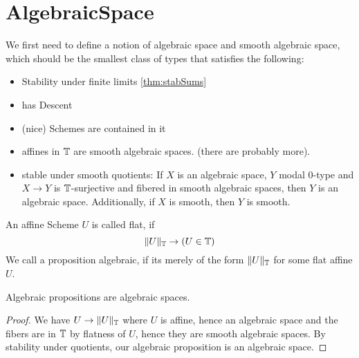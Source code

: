 \section{AlgebraicSpace}
We first need to define a notion of algebraic space and smooth algebraic space, which should be the smallest class of types that satisfies the following:
\begin{itemize}
	\item Stability under finite limits \ref{thm:stabSums} 
	\item has Descent
	\item (nice) Schemes are contained in it
	\item affines in $\mathbb{T}$ are smooth algebraic spaces.  (there are probably more). %
	\item stable under smooth quotients: If $X$ is an algebraic space, $Y$ modal 0-type and $X \to Y$ is $\mathbb{T}$-surjective and fibered in smooth algebraic spaces, then $Y$ is an algebraic space. Additionally, if $X$ is smooth, then $Y$ is smooth.
\end{itemize}
\begin{definition}
	An affine Scheme $U$ is called flat, if 
	\[\|U\|_{\mathbb{T}} \to (U \in \mathbb{T})\]	
	We call a proposition algebraic, if its merely of the form $\|U\|_{\mathbb{T}}$ for some flat affine $U$.
\end{definition}
\begin{lemma}
	Algebraic propositions are algebraic spaces.
\end{lemma}
\begin{proof}
	We have $U \to \|U\|_{\mathbb{T}}$ where $U$ is affine, hence an algebraic space and the fibers are in $\mathbb{T}$ by flatness of $U$, hence they are smooth algebraic spaces. By stability under quotients, our algebraic proposition is an algebraic space.
\end{proof}

